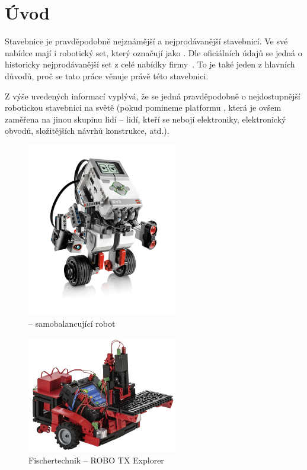 \chapter{Úvod}

Stavebnice \lego{ }je pravděpodobně nejznámější a nejprodávanější stavebnicí. 
Ve své nabídce mají i robotický set, který označují jako \legoM. 
Dle oficiálních údajů se jedná o historicky nejprodávanější set z celé nabídky firmy~\cite{legoGizmodo_SalesStatistic}. 
To je také jeden z hlavních důvodů, proč se tato práce věnuje právě této stavebnici. 

Z výše uvedených informací vyplývá, že se jedná pravděpodobně o nejdostupnější robotickou stavebnici na světě (pokud pomineme platformu \arduino, která je ovšem zaměřena na jinou skupinu lidí -- lidí, kteří se nebojí elektroniky, elektronický obvodů, složitějších návrhů konstrukce, atd.).

\begin{figure}[h]
 	\centering
	\includegraphics[width=250px]{images/lego-mindstorms-ev3_Robotics-for-Kids.png}
		\caption[\legoEV{ }-- samobalancující robot]{\legoEV{ }-- samobalancující robot\protect\footnotemark}
	\label{fig:lego-mindstorms-ev3_Robotics-for-Kids}
\end{figure}



\begin{figure}[h]
 	\centering
	\includegraphics[width=250px]{images/fischertechnik_ROBO-TX-Explorer_02.jpg}
		\caption[Fischertechnik -- ROBO TX Explorer]{Fischertechnik -- ROBO TX Explorer\protect\footnotemark}
	\label{fig:fischertechnik_ROBO-TX-Explorer}
\end{figure}

